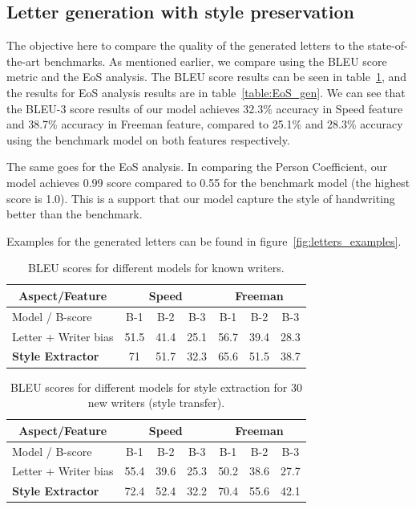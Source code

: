   \subsection{Letter generation with style preservation}
  \par The objective here to compare the quality of the generated letters to the state-of-the-art benchmarks. As mentioned earlier, we compare using the BLEU score metric and the EoS analysis.
  The BLEU score results can be seen in table~\ref{table:bleu_gen}, and the results for EoS analysis results are in table~\ref{table:EoS_gen}. We can see that the BLEU-3 score results of our model achieves 32.3\% accuracy in Speed feature and 38.7\% accuracy in Freeman feature, compared to 25.1\% and 28.3\% accuracy using the benchmark model on both features respectively.
  \par The same goes for the EoS analysis. In comparing the Person Coefficient, our model achieves 0.99 score compared to 0.55 for the benchmark model (the highest score is 1.0). This is a support that our model capture the style of handwriting better than the benchmark.
  \par Examples for the generated letters can be found in figure~\ref{fig:letters_examples}.


  \begin{table}[!htbp]
  \centering
  \begin{tabular}{|l||c|c|c||c|c|c|}
  \hline
  \multicolumn{1}{|c||}{Aspect/Feature} & \multicolumn{3}{c||}{ Speed } & \multicolumn{3}{c|}{ Freeman }   \\ \hline
  Model / B-score      & B-1  & B-2  & B-3           & B-1  & B-2   & B-3              \\ \hline
  Letter + Writer bias & 51.5 & 41.4 & 25.1          & 56.7 & 39.4  & 28.3             \\\hline
  \textbf{Style Extractor} & 71 & 51.7 & 32.3 & 65.6 & 51.5 & 38.7 \\\hline
  \end{tabular}
  \caption{BLEU scores for different models for known writers.}
  \label{table:bleu_gen}
  \end{table}

  \begin{table}[!htbp]
  \centering
  \begin{tabular}{|l||c|c|c||c|c|c|}
  \hline
  \multicolumn{1}{|c||}{Aspect/Feature} & \multicolumn{3}{c||}{ Speed } & \multicolumn{3}{c|}{ Freeman }   \\ \hline
  Model / B-score      & B-1  & B-2  & B-3           & B-1  & B-2   & B-3              \\ \hline
  Letter + Writer bias & 55.4 & 39.6 & 25.3 & 50.2 & 38.6 & 27.7             \\\hline
  \textbf{Style Extractor} & 72.4 & 52.4 & 32.2 & 70.4 & 55.6 & 42.1 \\\hline

  \end{tabular}
  \caption{BLEU scores for different models for style extraction for 30 new writers (style transfer).}
  \label{table:bleu_transfer}
  \end{table}

